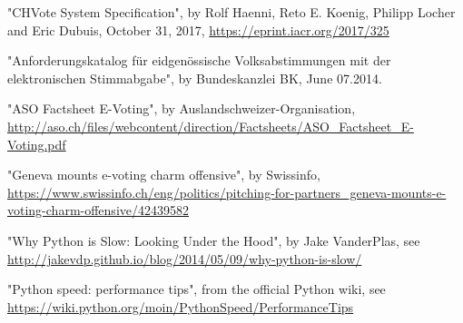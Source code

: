 \begin{thebibliography}{999}
	"CHVote System Specification", by Rolf Haenni, Reto E. Koenig, Philipp Locher and Eric Dubuis, October 31, 2017, \url{https://eprint.iacr.org/2017/325}

	"{}Anforderungskatalog für eidgenössische Volksabstimmungen mit der elektronischen Stimmabgabe"{}, by Bundeskanzlei BK, June 07.2014.

	"{}ASO Factsheet E-Voting"{}, by Auslandschweizer-Organisation, \url{http://aso.ch/files/webcontent/direction/Factsheets/ASO_Factsheet_E-Voting.pdf}
	
	"{}Geneva mounts e-voting charm offensive"{}, by Swissinfo, \url{https://www.swissinfo.ch/eng/politics/pitching-for-partners_geneva-mounts-e-voting-charm-offensive/42439582}

	"Why Python is Slow: Looking Under the Hood", by Jake VanderPlas, see \url{http://jakevdp.github.io/blog/2014/05/09/why-python-is-slow/}

	"Python speed: performance tips", from the official Python wiki, see \url{https://wiki.python.org/moin/PythonSpeed/PerformanceTips}
\end{thebibliography}
